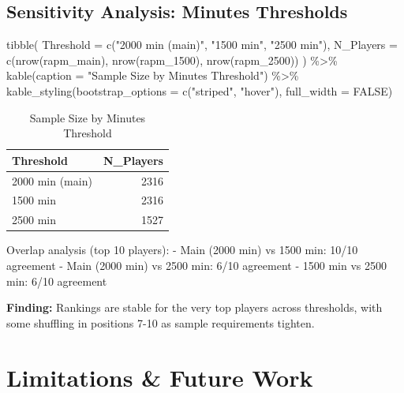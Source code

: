 \documentclass[
  letterpaper,
  DIV=11,
  numbers=noendperiod]{scrartcl}
\newenvironment{Shaded}{\begin{snugshade}}{\end{snugshade}}
\newcommand{\AttributeTok}[1]{\textcolor[rgb]{0.40,0.45,0.13}{#1}}
\newcommand{\ConstantTok}[1]{\textcolor[rgb]{0.56,0.35,0.01}{#1}}
\newcommand{\FunctionTok}[1]{\textcolor[rgb]{0.28,0.35,0.67}{#1}}
\newcommand{\NormalTok}[1]{\textcolor[rgb]{0.00,0.23,0.31}{#1}}
\newcommand{\SpecialCharTok}[1]{\textcolor[rgb]{0.37,0.37,0.37}{#1}}
\newcommand{\StringTok}[1]{\textcolor[rgb]{0.13,0.47,0.30}{#1}}
\begin{document}
\subsection{Sensitivity Analysis: Minutes
Thresholds}\label{sensitivity-analysis-minutes-thresholds}

\begin{Shaded}
\begin{Highlighting}[]
\FunctionTok{tibble}\NormalTok{(}
  \AttributeTok{Threshold =} \FunctionTok{c}\NormalTok{(}\StringTok{"2000 min (main)"}\NormalTok{, }\StringTok{"1500 min"}\NormalTok{, }\StringTok{"2500 min"}\NormalTok{),}
  \AttributeTok{N\_Players =} \FunctionTok{c}\NormalTok{(}\FunctionTok{nrow}\NormalTok{(rapm\_main), }\FunctionTok{nrow}\NormalTok{(rapm\_1500), }\FunctionTok{nrow}\NormalTok{(rapm\_2500))}
\NormalTok{) }\SpecialCharTok{\%\textgreater{}\%}
  \FunctionTok{kable}\NormalTok{(}\AttributeTok{caption =} \StringTok{"Sample Size by Minutes Threshold"}\NormalTok{) }\SpecialCharTok{\%\textgreater{}\%}
  \FunctionTok{kable\_styling}\NormalTok{(}\AttributeTok{bootstrap\_options =} \FunctionTok{c}\NormalTok{(}\StringTok{"striped"}\NormalTok{, }\StringTok{"hover"}\NormalTok{), }\AttributeTok{full\_width =} \ConstantTok{FALSE}\NormalTok{)}
\end{Highlighting}
\end{Shaded}

\begin{longtable}[t]{lr}
\caption{\label{tab:sensitivity-table}Sample Size by Minutes Threshold}\\
\toprule
Threshold & N\_Players\\
\midrule
2000 min (main) & 2316\\
1500 min & 2316\\
2500 min & 1527\\
\bottomrule
\end{longtable}

Overlap analysis (top 10 players): - Main (2000 min) vs 1500 min: 10/10
agreement - Main (2000 min) vs 2500 min: 6/10 agreement - 1500 min vs
2500 min: 6/10 agreement

\textbf{Finding:} Rankings are stable for the very top players across
thresholds, with some shuffling in positions 7-10 as sample requirements
tighten.

\section{Limitations \& Future Work}\label{limitations-future-work}
\end{document}
